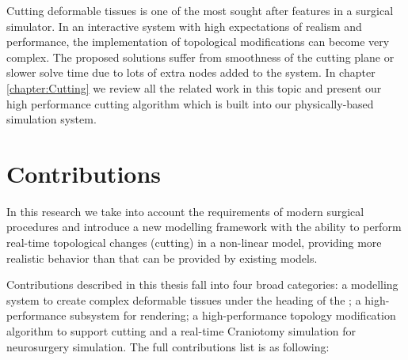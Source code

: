Cutting deformable tissues is one of the most sought after features in a surgical simulator. In an interactive 
system with high expectations of realism and performance, the implementation of topological 
modifications can become very complex. The proposed solutions suffer from smoothness of the cutting 
plane or slower solve time due to lots of extra nodes added to the system. In chapter 
\ref{chapter:Cutting} we review all the related work in this topic and present our high performance 
cutting algorithm which is built into our physically-based simulation system.


\section{Contributions}
\label{sec:contributions}
In this research we take into account the requirements of modern surgical procedures and introduce a 
new modelling framework with the ability to perform real-time topological changes (cutting) in a 
non-linear model, providing more realistic behavior than that can be provided by existing models. 

Contributions described in this thesis fall into four broad categories: a modelling system to create 
complex deformable tissues under the heading of the \blob; a high-performance subsystem for 
rendering; a high-performance topology modification algorithm to support cutting and a  
real-time Craniotomy simulation for neurosurgery simulation. The full contributions list is as 
following:

